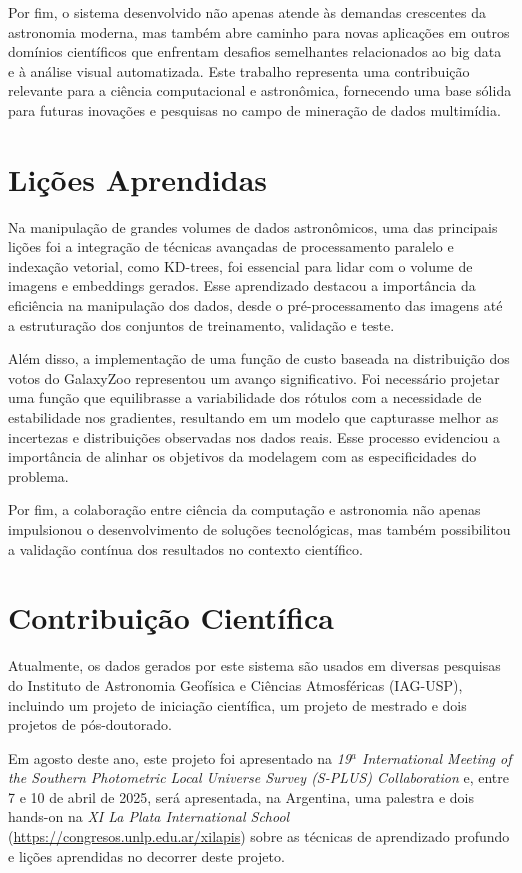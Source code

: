Por fim, o sistema desenvolvido não apenas atende às demandas crescentes da astronomia moderna, mas também abre caminho para novas aplicações em outros domínios científicos que enfrentam desafios semelhantes relacionados ao big data e à análise visual automatizada. Este trabalho representa uma contribuição relevante para a ciência computacional e astronômica, fornecendo uma base sólida para futuras inovações e pesquisas no campo de mineração de dados multimídia.




\section{Lições Aprendidas}
Na manipulação de grandes volumes de dados astronômicos, uma das principais lições foi a  integração de técnicas avançadas de processamento paralelo e indexação vetorial, como KD-trees, foi essencial para lidar com o volume de imagens e embeddings gerados. Esse aprendizado destacou a importância da eficiência na manipulação dos dados, desde o pré-processamento das imagens até a estruturação dos conjuntos de treinamento, validação e teste.

Além disso, a implementação de uma função de custo baseada na distribuição dos votos do GalaxyZoo representou um avanço significativo. Foi necessário projetar uma função que equilibrasse a variabilidade dos rótulos com a necessidade de estabilidade nos gradientes, resultando em um modelo que capturasse melhor as incertezas e distribuições observadas nos dados reais. Esse processo evidenciou a importância de alinhar os objetivos da modelagem com as especificidades do problema.

Por fim, a colaboração entre ciência da computação e astronomia não apenas impulsionou o desenvolvimento de soluções tecnológicas, mas também possibilitou a validação contínua dos resultados no contexto científico.



\section{Contribuição Científica}
Atualmente, os dados gerados por este sistema são usados em diversas pesquisas do Instituto de Astronomia Geofísica e Ciências Atmosféricas (IAG-USP), incluindo um projeto de iniciação científica, um projeto de mestrado e dois projetos de pós-doutorado.

Em agosto deste ano, este projeto foi apresentado na \emph{19$^a$ International Meeting of the Southern Photometric Local Universe Survey (S-PLUS) Collaboration} e, entre 7 e 10 de abril de 2025, será apresentada, na Argentina, uma palestra e dois hands-on na \emph{XI La Plata International School} (\url{https://congresos.unlp.edu.ar/xilapis}) sobre as técnicas de aprendizado profundo e lições aprendidas no decorrer deste projeto.




